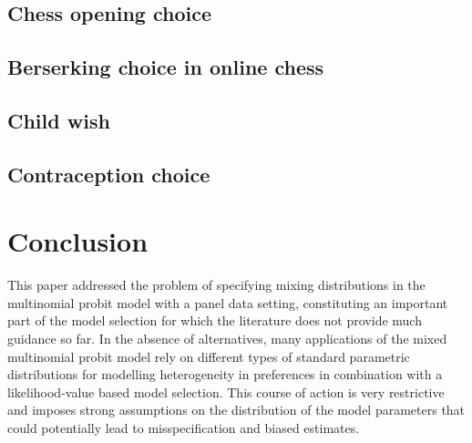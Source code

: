 \documentclass[article]{jss}
\begin{document}
\subsection{Chess opening choice} \label{subsec:chess_opening_choice}

\subsection{Berserking choice in online chess} \label{subsec:berserk}

\subsection{Child wish} \label{subsec:child_wish}

\subsection{Contraception choice} \label{subsec:contraception_choice}


\section{Conclusion} \label{sec:conclusion}

This paper addressed the problem of specifying mixing distributions in the multinomial probit model with a panel data setting, constituting an important part of the model selection for which the literature does not provide much guidance so far. In the absence of alternatives, many applications of the mixed multinomial probit model rely on different types of standard parametric distributions for modelling heterogeneity in preferences in combination with a likelihood-value based model selection. This course of action is very restrictive and imposes strong assumptions on the distribution of the model parameters that could potentially lead to misspecification and biased estimates.
\end{document}
